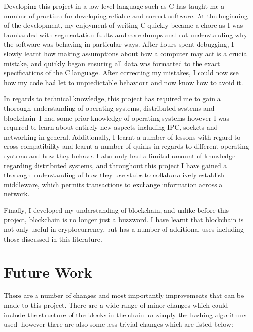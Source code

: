 \documentclass[a4paper, 11pt]{report}
\begin{document}
Developing this project in a low level language such as C has taught me a number of practises for developing reliable and correct software. At the beginning of the development, my enjoyment of writing C quickly became a chore as I was bombarded with segmentation faults and core dumps and not understanding why the software was behaving in particular ways. After hours spent debugging, I slowly learnt how making assumptions about how a computer may act is a crucial mistake, and quickly began ensuring all data was formatted to the exact specifications of the C language. After correcting my mistakes, I could now see how my code had let to unpredictable behaviour and now know how to avoid it.

In regards to technical knowledge, this project has required me to gain a thorough understanding of operating systems, distributed systems and \gls{blockchain}. I had some prior knowledge of operating systems however I was required to learn about entirely new aspects including \acrshort{IPC}, sockets and networking in general. Additionally, I learnt a number of lessons with regard to cross compatibility and learnt a number of quirks in regards to different operating systems and how they behave. I also only had a limited amount of knowledge regarding distributed systems, and throughout this project I have gained a thorough understanding of how they use \gls{stub}s to collaboratively establish \gls{middleware}, which permits transactions to exchange information across a network.

 Finally, I developed my understanding of \gls{blockchain}, and unlike before this project, \gls{blockchain} is no longer just a buzzword. I have learnt that \gls{blockchain} is not only useful in cryptocurrency, but has a number of additional uses including those discussed in this literature.

\section{Future Work}
There are a number of changes and most importantly improvements that can be made to this project. There are a wide range of minor changes which could include the structure of the blocks in the chain, or simply the \gls{hashing} algorithms used, however there are also some less trivial changes which are listed below:
\end{document}
